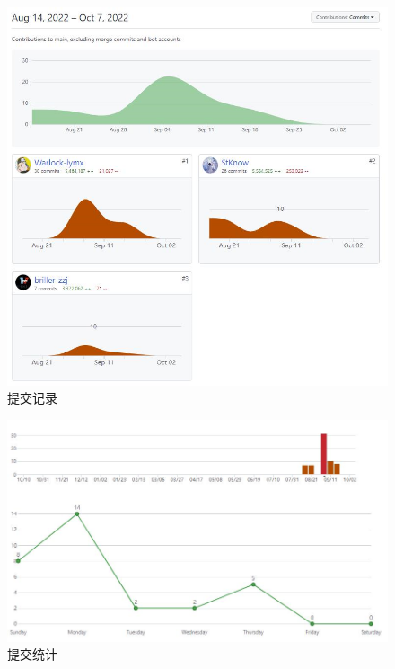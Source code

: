 \begin{figure}[H]
    \centering
    \includegraphics[scale=0.7]{figures/6.1.1.png}
    \caption{提交记录}
\end{figure}

\begin{figure}[H]
    \centering
    \includegraphics[scale=0.7]{figures/6.1.2.png}
    \caption{提交统计}
\end{figure}

